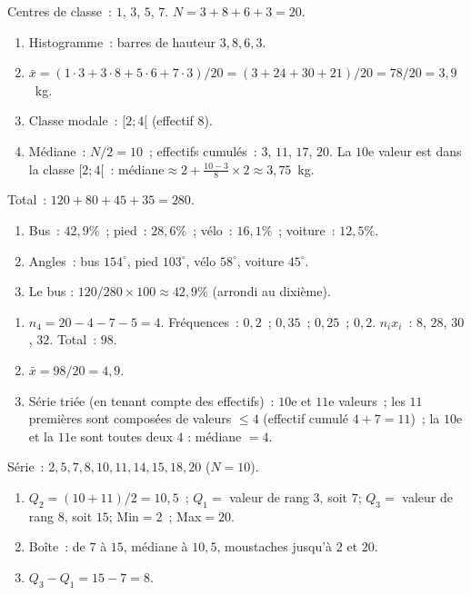 
Centres de classe~: $1$, $3$, $5$, $7$. $N=3+8+6+3=20$.
\begin{enumerate}
  \item Histogramme~: barres de hauteur $3,8,6,3$.
  \item $\bar{x}=(1\cdot3+3\cdot8+5\cdot6+7\cdot3)/20=(3+24+30+21)/20=78/20=3{,}9$~kg.
  \item Classe modale~: $[2;4[$ (effectif $8$).
  \item M\'ediane~: $N/2=10$~; effectifs cumul\'es~: $3$, $11$, $17$, $20$.
        La $10$e valeur est dans la classe $[2;4[$~: m\'ediane$\approx2+\frac{10-3}{8}\times2\approx3{,}75$~kg.
\end{enumerate}


Total~: $120+80+45+35=280$.
\begin{enumerate}
  \item Bus~: $42{,}9\%$~; pied~: $28{,}6\%$~; v\'elo~: $16{,}1\%$~; voiture~: $12{,}5\%$.
  \item Angles~: bus $154^{\circ}$, pied $103^{\circ}$, v\'elo $58^{\circ}$, voiture $45^{\circ}$.
  \item Le bus : $120/280\times100\approx42{,}9\%$ (arrondi au dixi\`eme).
\end{enumerate}


\begin{enumerate}
  \item $n_4=20-4-7-5=4$. Fr\'equences~: $0{,}2$~; $0{,}35$~; $0{,}25$~; $0{,}2$.
        $n_ix_i$~: $8$, $28$, $30$, $32$. Total~: $98$.
  \item $\bar{x}=98/20=4{,}9$.
  \item S\'erie tri\'ee (en tenant compte des effectifs)~: $10$e et $11$e valeurs~;
        les $11$ premi\`eres sont compos\'ees de valeurs $\leq4$ (effectif cumul\'e $4+7=11$)~;
        la $10$e et la $11$e sont toutes deux $4$ : m\'ediane $=4$.
\end{enumerate}


S\'erie~: $2,5,7,8,10,11,14,15,18,20$ ($N=10$).
\begin{enumerate}
  \item $Q_2=(10+11)/2=10{,}5$~; $Q_1=$ valeur de rang $3$, soit $7$;
        $Q_3=$ valeur de rang $8$, soit $15$;
        Min$=2$~; Max$=20$.
  \item Bo\^ite~: de $7$ \`a $15$, m\'ediane \`a $10{,}5$, moustaches jusqu'\`a $2$ et $20$.
  \item $Q_3-Q_1=15-7=8$.
\end{enumerate}

